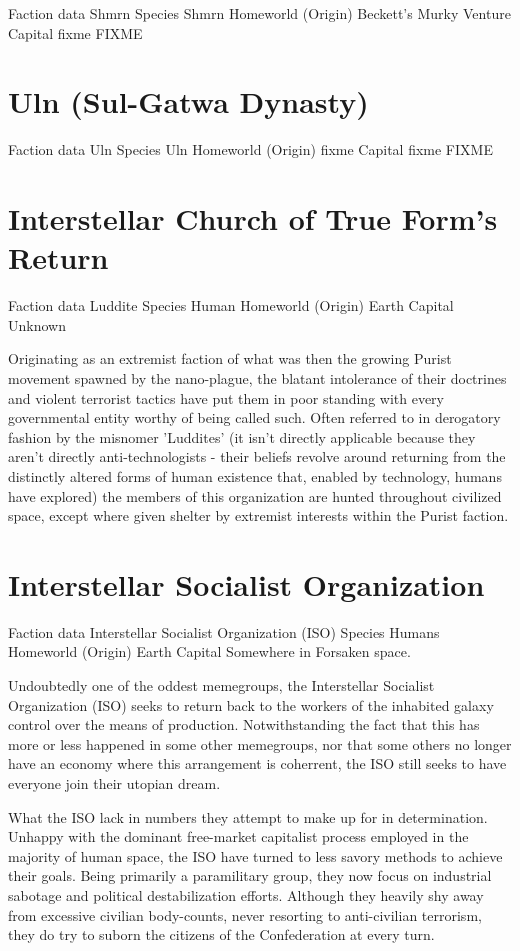 Faction data 
Shmrn 
Species 	Shmrn 
Homeworld (Origin) 	Beckett's Murky Venture 
Capital 	fixme 
FIXME 


\section{Uln (Sul-Gatwa Dynasty)}
Faction data 
Uln 
Species 	Uln 
Homeworld (Origin) 	fixme 
Capital 	fixme 
FIXME 

\section{Interstellar Church of True Form's Return}

Faction data 
Luddite 
Species 	Human 
Homeworld (Origin) 	Earth 
Capital 	Unknown 

Originating as an extremist faction of what was then the growing
Purist movement spawned by the nano-plague, the blatant intolerance of
their doctrines and violent terrorist tactics have put them in poor
standing with every governmental entity worthy of being called
such. Often referred to in derogatory fashion by the misnomer
'Luddites' (it isn't directly applicable because they aren't directly
anti-technologists - their beliefs revolve around returning from the
distinctly altered forms of human existence that, enabled by
technology, humans have explored) the members of this organization are
hunted throughout civilized space, except where given shelter by
extremist interests within the Purist faction.

 
\section{Interstellar Socialist Organization}

Faction data 
Interstellar Socialist Organization (ISO) 
Species 	Humans 
Homeworld (Origin) 	Earth 
Capital 	Somewhere in Forsaken space. 

Undoubtedly one of the oddest memegroups, the Interstellar Socialist
Organization (ISO) seeks to return back to the workers of the
inhabited galaxy control over the means of production. Notwithstanding
the fact that this has more or less happened in some other memegroups,
nor that some others no longer have an economy where this arrangement
is coherrent, the ISO still seeks to have everyone join their utopian
dream.

What the ISO lack in numbers they attempt to make up for in
determination. Unhappy with the dominant free-market capitalist
process employed in the majority of human space, the ISO have turned
to less savory methods to achieve their goals. Being primarily a
paramilitary group, they now focus on industrial sabotage and
political destabilization efforts. Although they heavily shy away from
excessive civilian body-counts, never resorting to anti-civilian
terrorism, they do try to suborn the citizens of the Confederation at
every turn.

